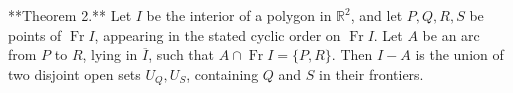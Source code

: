 **Theorem 2.** Let $I$ be the interior of a polygon in $\mathbb{R}^2$, and let $P, Q, R, S$ be points of $\operatorname{Fr} I$, appearing in the stated cyclic order on $\operatorname{Fr} I$. Let $A$ be an arc from $P$ to $R$, lying in $\overline{I}$, such that $A \cap \operatorname{Fr} I = \{P, R\}$. Then $I - A$ is the union of two disjoint open sets $U_Q, U_S$, containing $Q$ and $S$ in their frontiers.
